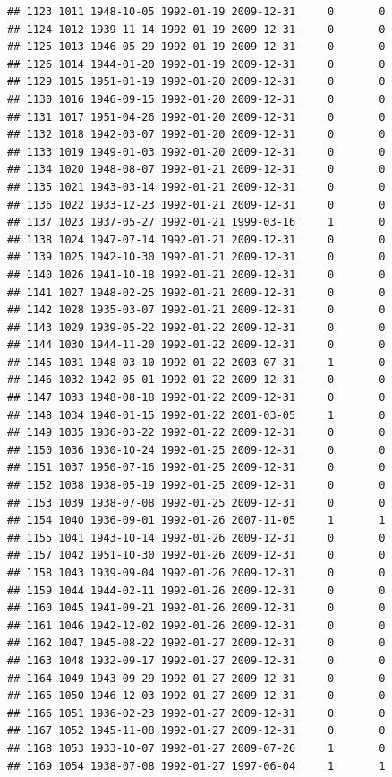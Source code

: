 \documentclass[
]{book}
\begin{document}
\begin{verbatim}
## 1123 1011 1948-10-05 1992-01-19 2009-12-31     0       0
## 1124 1012 1939-11-14 1992-01-19 2009-12-31     0       0
## 1125 1013 1946-05-29 1992-01-19 2009-12-31     0       0
## 1126 1014 1944-01-20 1992-01-19 2009-12-31     0       0
## 1129 1015 1951-01-19 1992-01-20 2009-12-31     0       0
## 1130 1016 1946-09-15 1992-01-20 2009-12-31     0       0
## 1131 1017 1951-04-26 1992-01-20 2009-12-31     0       0
## 1132 1018 1942-03-07 1992-01-20 2009-12-31     0       0
## 1133 1019 1949-01-03 1992-01-20 2009-12-31     0       0
## 1134 1020 1948-08-07 1992-01-21 2009-12-31     0       0
## 1135 1021 1943-03-14 1992-01-21 2009-12-31     0       0
## 1136 1022 1933-12-23 1992-01-21 2009-12-31     0       0
## 1137 1023 1937-05-27 1992-01-21 1999-03-16     1       0
## 1138 1024 1947-07-14 1992-01-21 2009-12-31     0       0
## 1139 1025 1942-10-30 1992-01-21 2009-12-31     0       0
## 1140 1026 1941-10-18 1992-01-21 2009-12-31     0       0
## 1141 1027 1948-02-25 1992-01-21 2009-12-31     0       0
## 1142 1028 1935-03-07 1992-01-21 2009-12-31     0       0
## 1143 1029 1939-05-22 1992-01-22 2009-12-31     0       0
## 1144 1030 1944-11-20 1992-01-22 2009-12-31     0       0
## 1145 1031 1948-03-10 1992-01-22 2003-07-31     1       0
## 1146 1032 1942-05-01 1992-01-22 2009-12-31     0       0
## 1147 1033 1948-08-18 1992-01-22 2009-12-31     0       0
## 1148 1034 1940-01-15 1992-01-22 2001-03-05     1       0
## 1149 1035 1936-03-22 1992-01-22 2009-12-31     0       0
## 1150 1036 1930-10-24 1992-01-25 2009-12-31     0       0
## 1151 1037 1950-07-16 1992-01-25 2009-12-31     0       0
## 1152 1038 1938-05-19 1992-01-25 2009-12-31     0       0
## 1153 1039 1938-07-08 1992-01-25 2009-12-31     0       0
## 1154 1040 1936-09-01 1992-01-26 2007-11-05     1       1
## 1155 1041 1943-10-14 1992-01-26 2009-12-31     0       0
## 1157 1042 1951-10-30 1992-01-26 2009-12-31     0       0
## 1158 1043 1939-09-04 1992-01-26 2009-12-31     0       0
## 1159 1044 1944-02-11 1992-01-26 2009-12-31     0       0
## 1160 1045 1941-09-21 1992-01-26 2009-12-31     0       0
## 1161 1046 1942-12-02 1992-01-26 2009-12-31     0       0
## 1162 1047 1945-08-22 1992-01-27 2009-12-31     0       0
## 1163 1048 1932-09-17 1992-01-27 2009-12-31     0       0
## 1164 1049 1943-09-29 1992-01-27 2009-12-31     0       0
## 1165 1050 1946-12-03 1992-01-27 2009-12-31     0       0
## 1166 1051 1936-02-23 1992-01-27 2009-12-31     0       0
## 1167 1052 1945-11-08 1992-01-27 2009-12-31     0       0
## 1168 1053 1933-10-07 1992-01-27 2009-07-26     1       0
## 1169 1054 1938-07-08 1992-01-27 1997-06-04     1       1

\end{verbatim}
\end{document}
